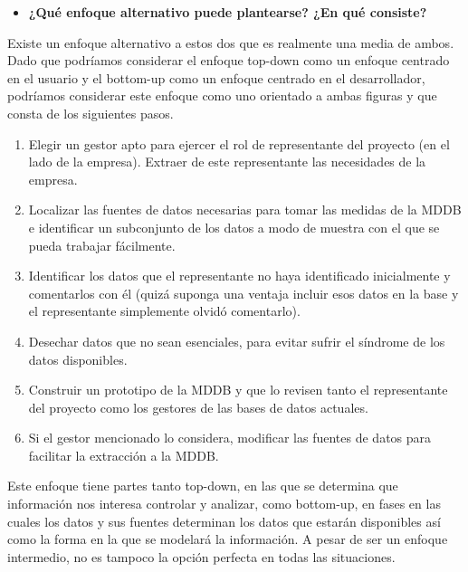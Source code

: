 \documentclass[paper=a4, fontsize=11pt]{scrartcl} %
\begin{document}
\begin{itemize}
\item \textbf{¿Qué enfoque alternativo puede plantearse? ¿En qué consiste?}
\end{itemize}
Existe un enfoque alternativo a estos dos que es realmente una media de ambos. Dado que podríamos considerar el enfoque top-down como un enfoque centrado en el usuario y el bottom-up como un enfoque centrado en el desarrollador, podríamos considerar este enfoque como uno orientado a ambas figuras y que consta de los siguientes pasos.
	\begin{enumerate}
	\item Elegir un gestor apto para ejercer el rol de representante del proyecto (en el lado de la empresa). Extraer de este representante las necesidades de la empresa.
	\item Localizar las fuentes de datos necesarias para tomar las medidas de la MDDB e identificar un subconjunto de los datos a modo de muestra con el que se pueda trabajar fácilmente.
	\item Identificar los datos que el representante no haya identificado inicialmente y comentarlos con él (quizá suponga una ventaja incluir esos datos en la base y el representante simplemente olvidó comentarlo).
	\item Desechar datos que no sean esenciales, para evitar sufrir el síndrome de los datos disponibles.
	\item Construir un prototipo de la MDDB y que lo revisen tanto el representante del proyecto como los gestores de las bases de datos actuales.
	\item Si el gestor mencionado lo considera, modificar las fuentes de datos para facilitar la extracción a la MDDB.
	\end{enumerate}
Este enfoque tiene partes tanto top-down, en las que se determina que información nos interesa controlar y analizar, como bottom-up, en fases en las cuales los datos y sus fuentes determinan los datos que estarán disponibles así como la forma en la que se modelará la información. A pesar de ser un enfoque intermedio, no es tampoco la opción perfecta en todas las situaciones.
\end{document}
